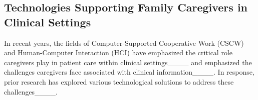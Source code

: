 





\subsection{Technologies Supporting Family Caregivers in Clinical Settings}


In recent years, the fields of Computer-Supported Cooperative Work (CSCW) and Human-Computer Interaction (HCI) have emphasized the critical role caregivers play in patient care within clinical settings____ and emphasized the challenges caregivers face associated with clinical information____. In response, prior research has explored various technological solutions to address these challenges____.


